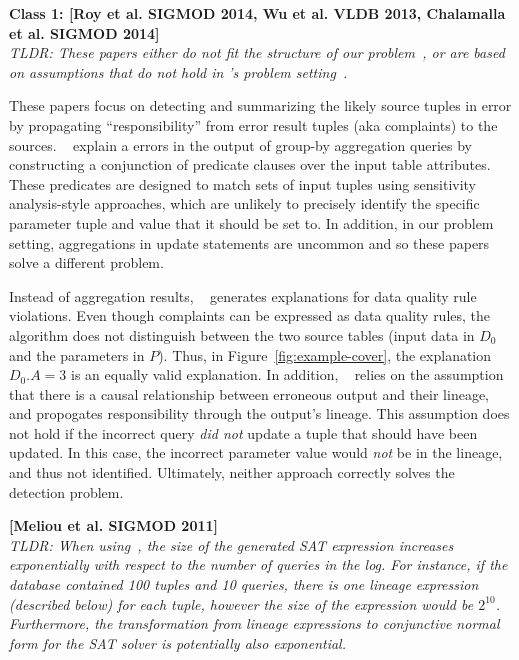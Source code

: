 \noindent \textbf{Class 1: [Roy et al. SIGMOD 2014, Wu et al. VLDB 2013, Chalamalla et al. SIGMOD 2014]} \\

{\it
TLDR: These papers either do not fit the structure of our problem~\cite{Wu13,roy2014formal}, or 
are based on assumptions that do not hold in \sys's problem setting~\cite{chalamalla2014}.
}


These papers focus on detecting and summarizing the likely source tuples in error by
propagating ``responsibility'' from error result tuples (aka complaints) to the sources.
~\cite{Wu13,roy2014formal} explain a errors in the output of group-by aggregation queries by constructing 
a conjunction of predicate clauses over the input table attributes. 
These predicates are designed to match sets of input tuples using sensitivity analysis-style approaches, which are unlikely to precisely identify the specific parameter tuple and value that it should be set to.
In addition, in our problem setting, aggregations in update statements are uncommon and so these papers solve a different problem.

Instead of aggregation results, ~\cite{chalamalla2014} generates explanations for data quality rule violations. 
Even though complaints can be expressed as data quality rules, the algorithm does not distinguish between the two source tables (input data in $D_0$ and the parameters in $P$).
Thus, in Figure~\ref{fig:example-cover}, the explanation $D_0.A = 3$ is an equally valid explanation. 
In addition, ~\cite{chalamalla2014} relies on the assumption that there is a causal relationship between erroneous output and their lineage, and propogates responsibility through the output's lineage.
This assumption does not hold if the incorrect query {\it did not} update a tuple that should have been updated.  In this case, the incorrect parameter value would {\it not} be in the lineage, and thus not identified. Ultimately, neither approach correctly solves the detection problem.

\noindent \textbf{[Meliou et al. SIGMOD 2011]} \\

{\it TLDR: When using~\cite{meliou2011tracing}, the size of the generated SAT expression 
increases exponentially with respect to the number of queries in the log. 
For instance, if the database contained 100 tuples and 10 queries, there is one lineage expression (described below) for each tuple, 
however the size of the expression would be $2^{10}$.  
Furthermore, the transformation from lineage expressions to conjunctive normal form for the SAT solver is potentially also exponential. 
}

